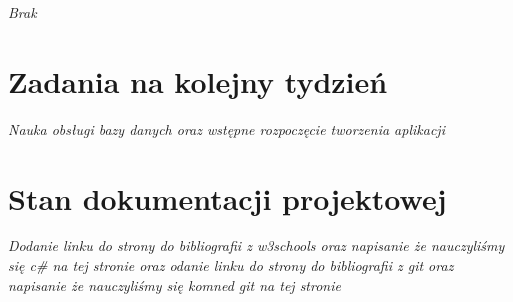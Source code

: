 \documentclass[12pt,a4paper]{mwart}
\begin{document}
\textit{Brak} %

\section{Zadania na kolejny tydzień}

\textit{Nauka obsługi bazy danych oraz wstępne rozpoczęcie tworzenia aplikacji} %

\section{Stan dokumentacji projektowej}

\textit{Dodanie linku do strony do bibliografii z w3schools oraz napisanie że nauczyliśmy się c\# na tej stronie oraz odanie linku do strony do bibliografii z git oraz napisanie że nauczyliśmy się komned git na tej stronie} %
\end{document}
